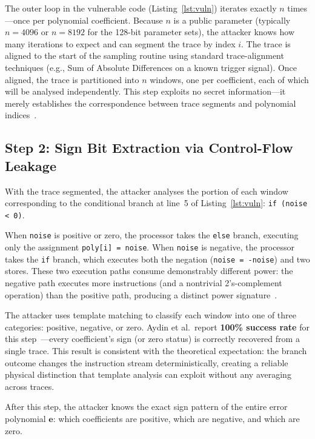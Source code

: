 \documentclass[sigconf,nonacm]{acmart}
\begin{document}
The outer loop in the vulnerable code (Listing~\ref{lst:vuln}) iterates exactly $n$
times---once per polynomial coefficient. Because $n$ is a public parameter (typically
$n = 4096$ or $n = 8192$ for the 128-bit parameter sets), the attacker knows how
many iterations to expect and can segment the trace by index $i$. The trace is
aligned to the start of the sampling routine using standard trace-alignment techniques
(e.g., Sum of Absolute Differences on a known trigger signal). Once aligned, the
trace is partitioned into $n$ windows, one per coefficient, each of which will be
analysed independently. This step exploits no secret information---it merely
establishes the correspondence between trace segments and polynomial
indices~\cite{aydin2022reveal}.

\subsection{Step 2: Sign Bit Extraction via Control-Flow Leakage}

With the trace segmented, the attacker analyses the portion of each window
corresponding to the conditional branch at line~5 of Listing~\ref{lst:vuln}:
\texttt{if (noise < 0)}.

When \texttt{noise} is positive or zero, the processor takes the \texttt{else}
branch, executing only the assignment \texttt{poly[i] = noise}. When \texttt{noise}
is negative, the processor takes the \texttt{if} branch, which executes both the
negation (\texttt{noise = -noise}) and two stores. These two execution paths consume
demonstrably different power: the negative path executes more instructions (and a
nontrivial 2's-complement operation) than the positive path, producing a distinct
power signature~\cite{aydin2022reveal}.

The attacker uses template matching to classify each window into one of three
categories: positive, negative, or zero. Aydin et al.\ report \textbf{100\% success
rate} for this step~\cite{aydin2022reveal}---every coefficient's sign (or zero
status) is correctly recovered from a single trace. This result is consistent with
the theoretical expectation: the branch outcome changes the instruction stream
deterministically, creating a reliable physical distinction that template analysis
can exploit without any averaging across traces.

After this step, the attacker knows the exact sign pattern of the entire error
polynomial $\mathbf{e}$: which coefficients are positive, which are negative, and
which are zero.
\end{document}
